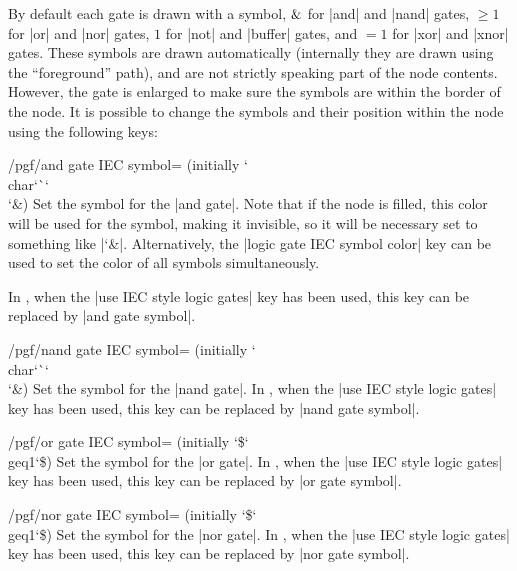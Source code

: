   By default each gate is drawn with a symbol, $\char`\&$ for |and| and 
  |nand| gates, $\geq1$ for |or| and |nor| gates, $1$ for |not| and 
  |buffer| gates, and $=1$ for |xor| and |xnor| gates. These symbols 
  are drawn automatically (internally they are drawn using the 
  ``foreground'' path), and are not strictly speaking part of the node
  contents. However, the gate is enlarged to make sure the symbols are 
  within the border of the node.
  It is possible to change
  the symbols and their position within the node using the following
  keys:
  
\begin{key}{/pgf/and gate IEC symbol= (initially \char`\\char\char`\`\char`\\\char`\&)}
  Set the symbol for the |and gate|. Note that if the node is filled,
  this color will be used for the symbol, making it invisible, so
  it will be necessary set  to something like
  |\color{black}\char`\&|. Alternatively, the 
  |logic gate IEC symbol color| key can be used to set the color
  of all symbols simultaneously.
  
  In \tikzname, when the |use IEC style logic gates| key has been 
  used, this key can be replaced by |and gate symbol|.
\end{key}

\begin{key}{/pgf/nand gate IEC symbol= (initially \char`\\char\char`\`\char`\\\char`\&)}
  Set the symbol for the |nand gate|.  
  In \tikzname, when the |use IEC style logic gates| key has been 
  used, this key can be replaced by |nand gate symbol|.
\end{key}

\begin{key}{/pgf/or gate IEC symbol= (initially \char`\$\char`\\geq1\char`\$)}
  Set the symbol for the |or gate|.  
  In \tikzname, when the |use IEC style logic gates| key has been 
  used, this key can be replaced by |or gate symbol|.
\end{key}

\begin{key}{/pgf/nor gate IEC symbol= (initially \char`\$\char`\\geq1\char`\$)}
  Set the symbol for the |nor gate|.  
  In \tikzname, when the |use IEC style logic gates| key has been 
  used, this key can be replaced by |nor gate symbol|.
\end{key}

